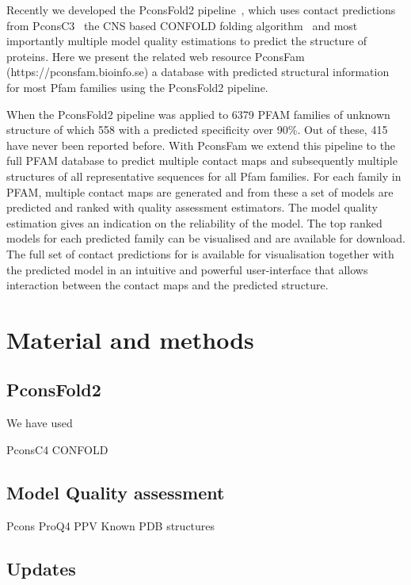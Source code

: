 \documentclass[a4,center,fleqn]{NAR}
\begin{document}
Recently we developed the PconsFold2 pipeline~\cite{Michel28881974}, which uses contact
predictions from PconsC3~\cite{Michel28535189} the CNS based CONFOLD folding
algorithm~\cite{Adhikari25974172} and most importantly multiple model quality estimations
\cite{Uziela28052925,Lundstrom:2001} to predict the structure of
proteins. Here we present the related web resource PconsFam
(https://pconsfam.bioinfo.se) a database with predicted structural
information for most Pfam families using the PconsFold2
pipeline.









When the PconsFold2 pipeline was applied to 6379 PFAM families of
unknown structure of which 558 with a predicted specificity over
90\%. Out of these, 415 have never been reported before.  With
PconsFam we extend this pipeline to the full PFAM database to predict
multiple contact maps and subsequently multiple structures of all
representative sequences for all Pfam families. For each family in
PFAM, multiple contact maps are generated and from these a set of
models are predicted and ranked with quality assessment
estimators. The model quality estimation gives an indication on the
reliability of the model. The top ranked models for each predicted
family can be visualised and are available for download. The full set
of contact predictions for is available for visualisation together
with the predicted model in an intuitive and powerful user-interface
that allows interaction between the contact maps and the predicted
structure. 

\section{Material and methods}
\subsection{PconsFold2}
We have used 

PconsC4
CONFOLD

\subsection{Model Quality assessment}
Pcons
ProQ4
PPV
Known PDB structures

\subsection{Updates}
\end{document}
